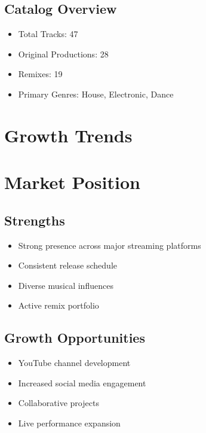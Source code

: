 \documentclass{article}
\begin{document}
\subsection{Catalog Overview}
\begin{itemize}
    \item Total Tracks: 47
    \item Original Productions: 28
    \item Remixes: 19
    \item Primary Genres: House, Electronic, Dance
\end{itemize}

\section{Growth Trends}

\section{Market Position}
\subsection{Strengths}
\begin{itemize}
    \item Strong presence across major streaming platforms
    \item Consistent release schedule
    \item Diverse musical influences
    \item Active remix portfolio
\end{itemize}

\subsection{Growth Opportunities}
\begin{itemize}
    \item YouTube channel development
    \item Increased social media engagement
    \item Collaborative projects
    \item Live performance expansion
\end{itemize}
\end{document}
